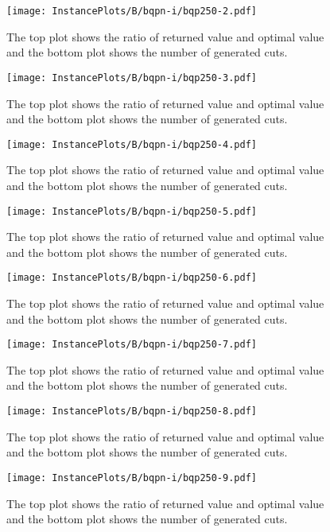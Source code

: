 \documentclass[10pt,a4paper]{article}
\begin{document}
\begin{figure}[H]
\texttt{[image: InstancePlots/B/bqpn-i/bqp250-2.pdf]}
\caption{The top plot shows the ratio of returned value and optimal value     and the bottom plot shows the number of generated cuts.}
\end{figure}

\begin{figure}[H]
\texttt{[image: InstancePlots/B/bqpn-i/bqp250-3.pdf]}
\caption{The top plot shows the ratio of returned value and optimal value     and the bottom plot shows the number of generated cuts.}
\end{figure}

\begin{figure}[H]
\texttt{[image: InstancePlots/B/bqpn-i/bqp250-4.pdf]}
\caption{The top plot shows the ratio of returned value and optimal value     and the bottom plot shows the number of generated cuts.}
\end{figure}

\begin{figure}[H]
\texttt{[image: InstancePlots/B/bqpn-i/bqp250-5.pdf]}
\caption{The top plot shows the ratio of returned value and optimal value     and the bottom plot shows the number of generated cuts.}
\end{figure}

\begin{figure}[H]
\texttt{[image: InstancePlots/B/bqpn-i/bqp250-6.pdf]}
\caption{The top plot shows the ratio of returned value and optimal value     and the bottom plot shows the number of generated cuts.}
\end{figure}

\begin{figure}[H]
\texttt{[image: InstancePlots/B/bqpn-i/bqp250-7.pdf]}
\caption{The top plot shows the ratio of returned value and optimal value     and the bottom plot shows the number of generated cuts.}
\end{figure}

\begin{figure}[H]
\texttt{[image: InstancePlots/B/bqpn-i/bqp250-8.pdf]}
\caption{The top plot shows the ratio of returned value and optimal value     and the bottom plot shows the number of generated cuts.}
\end{figure}

\begin{figure}[H]
\texttt{[image: InstancePlots/B/bqpn-i/bqp250-9.pdf]}
\caption{The top plot shows the ratio of returned value and optimal value     and the bottom plot shows the number of generated cuts.}
\end{figure}
\end{document}
